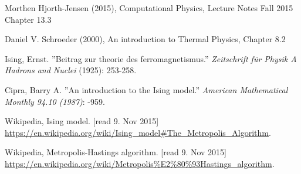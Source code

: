\documentclass[twoside,utf8]{article}
\begin{document}
\begin{thebibliography}{99} %
 
 Morthen Hjorth-Jensen (2015),
 \newblock Computational Physics, Lecture Notes Fall 2015
 \newblock Chapter 13.3
 
 Daniel V. Schroeder (2000),
 \newblock An introduction to Thermal Physics,
 \newblock Chapter 8.2
 
  Ising, Ernst.  
  \newblock ''Beitrag zur theorie des ferromagnetismus.''
  \newblock \textit{ Zeitschrift f{\"u}r Physik A Hadrons and Nuclei }
   (1925): 253-258.

 Cipra, Barry A.  
 \newblock ''An introduction to the Ising model.''
 \newblock \textit{American Mathematical Monthly 94.10 (1987)}: 
 -959.

 Wikipedia,
 \newblock Ising model. [read 9. Nov 2015]
 \newblock \newline
   \small{\url{https://en.wikipedia.org/wiki/Ising_model#The_Metropolis_Algorithm}}.

 Wikipedia,
 \newblock Metropolis-Hastings algorithm. [read 9. Nov 2015]
 \newblock \newline
   \small{\url{https://en.wikipedia.org/wiki/Metropolis%E2%80%93Hastings_algorithm}}.


\end{thebibliography}
\end{document}
